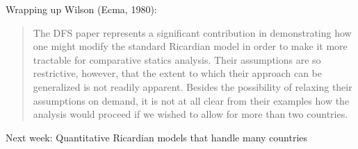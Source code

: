 \documentclass[11pt,notes=hide,aspectratio=169]{beamer}
\begin{document}
\begin{frame}{Wrapping up}
Wilson (Ecma, 1980):
\begin{quote}
{\small The DFS paper represents a significant contribution in demonstrating how one might modify the standard Ricardian model in order to make it more tractable for comparative statics analysis.
Their assumptions are so restrictive, however, that the extent to which their approach can be generalized is not readily apparent.
Besides the possibility of relaxing their assumptions on demand, it is not at all clear from their examples how the analysis would proceed if we wished to allow for more than two countries.\par}
\end{quote}
\vfill
Next week: 
Quantitative Ricardian models that handle many countries
\end{frame}
\end{document}
